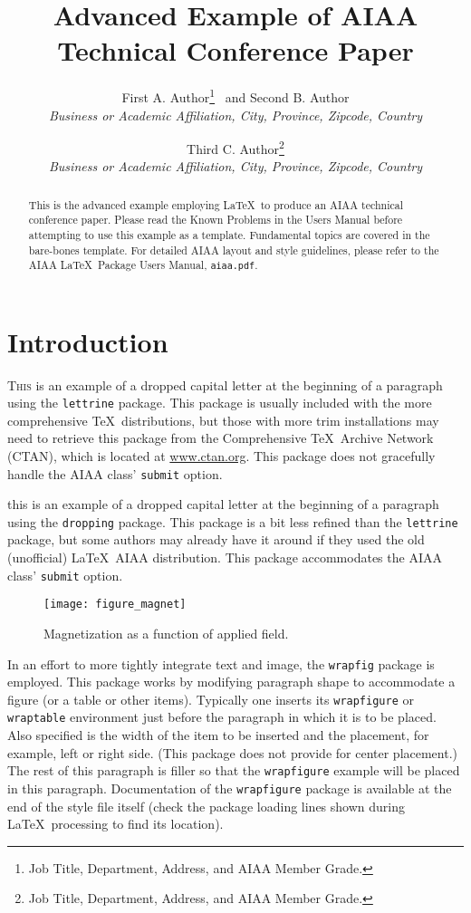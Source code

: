 \documentclass[]{aiaa-tc}%
\title{Advanced Example of AIAA Technical Conference Paper}
\author{
  First A. Author\thanks{Job Title, Department, Address, and AIAA Member Grade.}
  \ and Second B. Author\thanksibid{1}\\
  {\normalsize\itshape
   Business or Academic Affiliation, City, Province, Zipcode, Country}\\
  \and
  Third C. Author\thanks{Job Title, Department, Address,
                         and AIAA Member Grade.}\\
  {\normalsize\itshape
  Business or Academic Affiliation, City, Province, Zipcode, Country}
 }
\newcommand{\package}[1]{\texttt{#1}}
\newcommand{\file}[1]{\texttt{#1}}
\begin{document}
\maketitle

\begin{abstract}
This is the advanced example employing \LaTeX\ to produce an AIAA
technical conference paper.
Please read the Known Problems in the Users Manual before attempting
to use this example as a template.
Fundamental topics are covered in the bare-bones template.
For detailed AIAA layout and style guidelines, please refer to the AIAA
\LaTeX\ Package Users Manual, \file{aiaa.pdf}.
\end{abstract}

\printglossary%

\section{Introduction}

\lettrine[nindent=0pt]{T}{his} is an example of a dropped capital letter
at the beginning of a paragraph using the \package{lettrine} package.
This package is usually included with the more comprehensive \TeX\
distributions, but those with more trim installations may need to
retrieve this package from the Comprehensive \TeX\ Archive Network
(CTAN), which is located at \href{http://www.ctan.org}{www.ctan.org}.
This package does not gracefully handle the AIAA class' \verb|submit|
option.

 this is an example of a dropped capital
letter at the beginning of a paragraph using the \package{dropping}
package.
This package is a bit less refined than the \package{lettrine} package,
but some authors may already have it around if they used the old
(unofficial) \LaTeX\ AIAA distribution.
This package accommodates the AIAA class' \verb|submit| option.

\begin{wrapfigure}{R}{0.3\linewidth}
 \texttt{[image: figure\_magnet]}
 \caption{Magnetization as a function of applied field.}
 \label{f:magnetic_field}
\end{wrapfigure}

In an effort to more tightly integrate text and image, the
\package{wrapfig} package is employed.
This package works by modifying paragraph shape to accommodate a figure
(or a table or other items).
Typically one inserts its \verb|wrapfigure| or \verb|wraptable|
environment just before the paragraph in which it is to be placed.
Also specified is the width of the item to be inserted and the
placement, for example, left or right side.
(This package does not provide for center placement.)
The rest of this paragraph is filler so that the \verb|wrapfigure|
example will be placed in this paragraph.
Documentation of the \package{wrapfigure} package is available at the
end of the style file itself (check the package loading lines shown
during \LaTeX\ processing to find its location).
\end{document}
